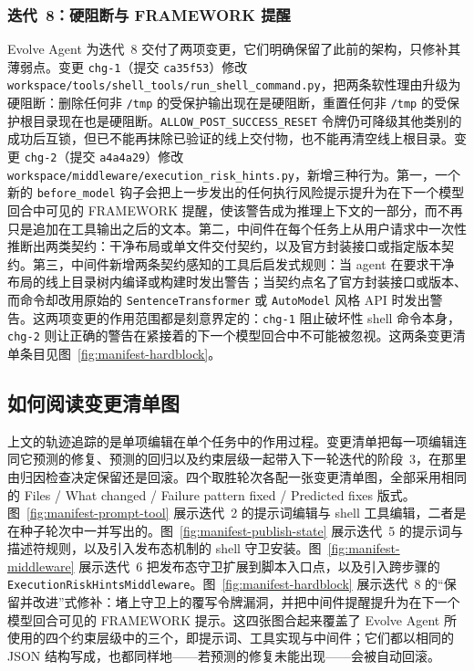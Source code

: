 
\FloatBarrier

\subsubsection{迭代~8：硬阻断与 FRAMEWORK 提醒}
\label{app:case-study:changes:iter8}

Evolve Agent 为迭代~8 交付了两项变更，它们明确保留了此前的架构，只修补其薄弱点。变更 \texttt{chg-1}（提交 \texttt{ca35f53}）修改 \texttt{workspace/tools/shell\_tools/run\_shell\_command.py}，把两条软性理由升级为硬阻断：删除任何非 \texttt{/tmp} 的受保护输出现在是硬阻断，重置任何非 \texttt{/tmp} 的受保护根目录现在也是硬阻断。\texttt{ALLOW\_POST\_SUCCESS\_RESET} 令牌仍可降级其他类别的成功后互锁，但已不能再抹除已验证的线上交付物，也不能再清空线上根目录。变更 \texttt{chg-2}（提交 \texttt{a4a4a29}）修改 \texttt{workspace/middleware/execution\_risk\_hints.py}，新增三种行为。第一，一个新的 \texttt{before\_model} 钩子会把上一步发出的任何执行风险提示提升为在下一个模型回合中可见的 FRAMEWORK 提醒，使该警告成为推理上下文的一部分，而不再只是追加在工具输出之后的文本。第二，中间件在每个任务上从用户请求中一次性推断出两类契约：干净布局或单文件交付契约，以及官方封装接口或指定版本契约。第三，中间件新增两条契约感知的工具后启发式规则：当 agent 在要求干净布局的线上目录树内编译或构建时发出警告；当契约点名了官方封装接口或版本、而命令却改用原始的 \texttt{SentenceTransformer} 或 \texttt{AutoModel} 风格 API 时发出警告。这两项变更的作用范围都是刻意界定的：\texttt{chg-1} 阻止破坏性 shell 命令本身，\texttt{chg-2} 则让正确的警告在紧接着的下一个模型回合中不可能被忽视。这两条变更清单条目见图~\ref{fig:manifest-hardblock}。


\FloatBarrier

\subsection{如何阅读变更清单图}
\label{app:case-study:manifest}

上文的轨迹追踪的是单项编辑在单个任务中的作用过程。变更清单把每一项编辑连同它预测的修复、预测的回归以及约束层级一起带入下一轮迭代的阶段~3，在那里由归因检查决定保留还是回滚。四个取胜轮次各配一张变更清单图，全部采用相同的 Files / What changed / Failure pattern fixed / Predicted fixes 版式。图~\ref{fig:manifest-prompt-tool} 展示迭代~2 的提示词编辑与 shell 工具编辑，二者是在种子轮次中一并写出的。图~\ref{fig:manifest-publish-state} 展示迭代~5 的提示词与描述符规则，以及引入发布态机制的 shell 守卫安装。图~\ref{fig:manifest-middleware} 展示迭代~6 把发布态守卫扩展到脚本入口点，以及引入跨步骤的 \texttt{ExecutionRiskHintsMiddleware}。图~\ref{fig:manifest-hardblock} 展示迭代~8 的“保留并改进”式修补：堵上守卫上的覆写令牌漏洞，并把中间件提醒提升为在下一个模型回合可见的 FRAMEWORK 提示。这四张图合起来覆盖了 Evolve Agent 所使用的四个约束层级中的三个，即提示词、工具实现与中间件；它们都以相同的 JSON 结构写成，也都同样地——若预测的修复未能出现——会被自动回滚。
